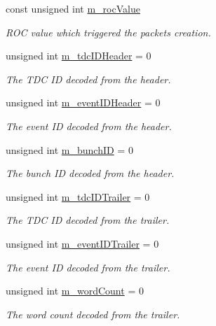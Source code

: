 \begin{DoxyCompactItemize}
\item 
const unsigned int \hyperlink{class_packet_ac4587a52a089f8fa1b7a899e4b46cb7d}{m\+\_\+roc\+Value}
\begin{DoxyCompactList}\small\item\em R\+OC value which triggered the packet\textquotesingle{}s creation. \end{DoxyCompactList}\item 
unsigned int \hyperlink{class_packet_a0f39ba4b6d5a8732381c1bcbbeeb7eb9}{m\+\_\+tdc\+I\+D\+Header} = 0
\begin{DoxyCompactList}\small\item\em The T\+DC ID decoded from the header. \end{DoxyCompactList}\item 
unsigned int \hyperlink{class_packet_a3abf93570be0669506f39b391bc574ca}{m\+\_\+event\+I\+D\+Header} = 0
\begin{DoxyCompactList}\small\item\em The event ID decoded from the header. \end{DoxyCompactList}\item 
unsigned int \hyperlink{class_packet_ad0a2dce379a45ee0f899d495f5e760fc}{m\+\_\+bunch\+ID} = 0
\begin{DoxyCompactList}\small\item\em The bunch ID decoded from the header. \end{DoxyCompactList}\item 
unsigned int \hyperlink{class_packet_aad739524a3b965eef89c827339b2e1f2}{m\+\_\+tdc\+I\+D\+Trailer} = 0
\begin{DoxyCompactList}\small\item\em The T\+DC ID decoded from the trailer. \end{DoxyCompactList}\item 
unsigned int \hyperlink{class_packet_ae32fc3c9665b68f00dabd9327d4c84c6}{m\+\_\+event\+I\+D\+Trailer} = 0
\begin{DoxyCompactList}\small\item\em The event ID decoded from the trailer. \end{DoxyCompactList}\item 
unsigned int \hyperlink{class_packet_a6c3f1d98101c049bc032aca63d244b89}{m\+\_\+word\+Count} = 0
\begin{DoxyCompactList}\small\item\em The word count decoded from the trailer. \end{DoxyCompactList}\item 

\end{DoxyCompactItemize}
